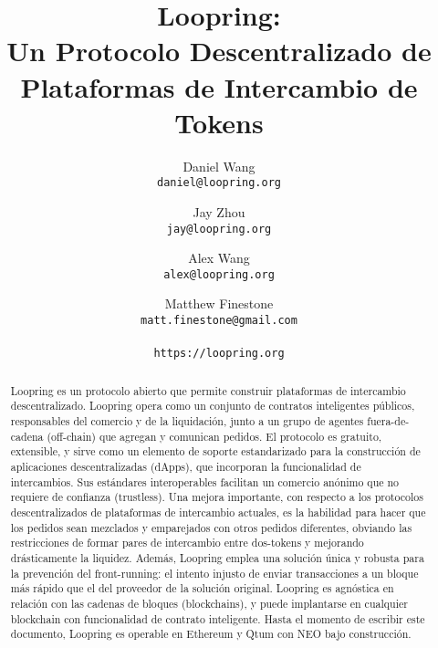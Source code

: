 \documentclass[UTF8,nofonts]{article}
\title{\textbf{Loopring:}\\\textbf{Un Protocolo Descentralizado de Plataformas de Intercambio de Tokens}}
\author{
  Daniel Wang\\
  \texttt{daniel@loopring.org}\\
  \and
  	Jay Zhou\\
  	\texttt{jay@loopring.org}\\
  	\and
  	Alex Wang\\
  	\texttt{alex@loopring.org}\\
  	\and
  	Matthew Finestone\\
  	\texttt{matt.finestone@gmail.com}\\ 
  \\
  \texttt{https://loopring.org}
 }
\begin{document}
\maketitle


\begin{abstract}
Loopring es un protocolo abierto que permite construir plataformas de intercambio descentralizado. Loopring opera como un conjunto de contratos inteligentes p\'ublicos, responsables del comercio y de la liquidaci\'on, junto a un grupo de agentes fuera-de-cadena (off-chain) que agregan y comunican pedidos. El protocolo es gratuito, extensible, y sirve como un elemento de soporte estandarizado para la construcci\'on de aplicaciones descentralizadas (dApps), que incorporan la funcionalidad de intercambios. Sus est\'andares interoperables facilitan un comercio an\'onimo que no requiere de confianza (trustless). Una mejora importante, con respecto a los protocolos descentralizados de plataformas de intercambio actuales, es la habilidad para hacer que los pedidos sean mezclados y emparejados con otros pedidos diferentes, obviando las restricciones de formar pares de intercambio entre dos-tokens y mejorando dr\'asticamente la liquidez. Adem\'as, Loopring emplea una soluci\'on \'unica y robusta para la prevenci\'on del front-running: el intento injusto de enviar transacciones a un bloque m\'as r\'apido que el del proveedor de la soluci\'on original. Loopring es agn\'ostica en relaci\'on con las cadenas de bloques (blockchains), y puede implantarse en cualquier blockchain con funcionalidad de contrato inteligente. Hasta el momento de escribir este documento, Loopring es operable en Ethereum \cite{buterin2017ethereum} \cite{wood2014ethereum} y Qtum \cite{dai2017smart} con NEO \cite{atterlonn2018distributed} bajo construcci\'on.
\end{abstract}
\end{document}

